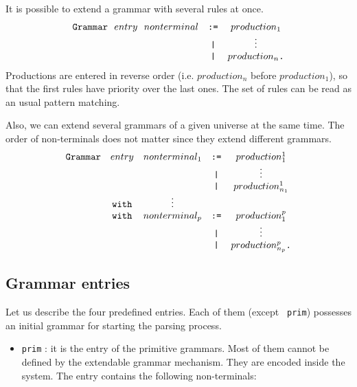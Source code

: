 {It is possible to extend a grammar with several rules at once.
$$
\begin{array}{rcc}
\verb+Grammar+~~entry~~nonterminal
        & \verb+:=+ & production_1 \\
        & \verb+|+  & \vdots    \\
        & \verb+|+  & production_n \verb+.+ \\
\end{array}
$$
Productions are entered in reverse order (i.e. $production_n$ before
$production_1$), so that the first rules have priority over the last
ones. The set of rules can be read as an usual pattern matching.

\noindent Also, we can extend several grammars of a given universe at
the same time. The order of non-terminals does not matter since they
extend different grammars.
$$
\begin{array}{rcccc}
\verb+Grammar+ & entry & nonterminal_1
                         & \verb+:=+ & production_1^1 \\
               &&        & \verb+|+  & \vdots    \\         
               &&        & \verb+|+  & production_{n_1}^1  \\
               & \verb+with+ & \vdots  && \\
               & \verb+with+ & nonterminal_p
                         & \verb+:=+ & production_1^p \\
               &&        & \verb+|+  & \vdots    \\         
               &&        & \verb+|+  & production_{n_p}^p \verb+.+ \\ 
\end{array}
$$


\subsection{Grammar entries}
\label{predefined-grammars}

Let us describe the four predefined entries. Each of them (except {\tt
prim}) possesses an initial grammar for starting the parsing process.

\begin{itemize}
\item \verb+prim+ : it is the entry of the primitive grammars. Most of
  them cannot be defined by the extendable grammar mechanism. They are
  encoded inside the system. The entry contains the following
  non-terminals:


\end{itemize}}
